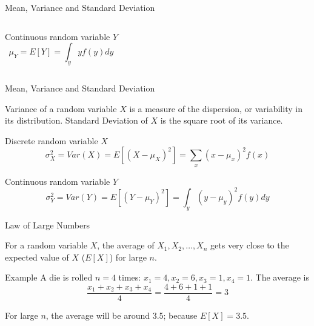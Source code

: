 \documentclass{beamer}\usepackage[]{graphicx}\usepackage[]{color}
\begin{document}
\begin{darkframes}
\begin{frame}[label=lists]{Mean, Variance and Standard Deviation}
\begin{columns}[onlytextwidth]
        	Continuous random variable $Y$
        	$$
				\mu_Y = E[Y] = \int_y y f(y) dy	        	
        	$$
        	        
        \end{columns}


				
	\end{frame}





	\begin{frame}[label=lists]{Mean, Variance and Standard Deviation}
		
		\begin{definition}
			\alert{Variance} of a random variable $X$ is a measure of the dispersion, or variability in its distribution. \alert{Standard Deviation} of $X$ is the square root of its variance.
		\end{definition}
		
        	Discrete random variable $X$
        	$$
				\sigma^2_X = Var(X) = E[(X-\mu_X)^2] = \sum_x (x-\mu_x)^2 f(x)	        	
        	$$
        	
        	Continuous random variable $Y$
        	$$
				\sigma^2_Y = Var(Y) = E[(Y-\mu_Y)^2] = \int_y (y-\mu_y)^2 f(y)dy	        	
        	$$
   			
	\end{frame}





	\begin{frame}[label=lists]{Law of Large Numbers}
		
		\begin{definition}
			For a random variable $X$, the average of $X_1, X_2,\ldots,X_n$ gets very close to the expected value of $X$ ($E[X]$) for large $n$.
		\end{definition}
		\begin{exampleblock}{Example}
			A die is rolled $n=4$ times: $x_1=4, x_2=6, x_3=1, x_4=1$. The average is
			$$
				\frac{x_1 + x_2 + x_3 + x_4}{4} = \frac{4+6+1+1}{4}=3
			$$
		\end{exampleblock}
		
		For large $n$, the average will be around 3.5; because $E[X]=3.5$.
   			
	\end{frame}
	

\end{darkframes}
\end{document}
